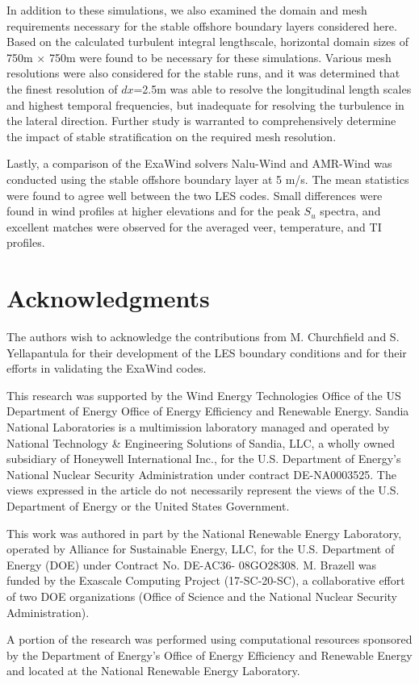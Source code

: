 \documentclass[conf]{new-aiaa}
\begin{document}
In addition to these simulations, we also examined the domain and mesh
requirements necessary for the stable offshore boundary layers
considered here.  Based on the calculated turbulent integral
lengthscale, horizontal domain sizes of 750m $\times$ 750m were found
to be necessary for these simulations.  Various mesh resolutions were
also considered for the stable runs, and it was determined that the
finest resolution of $dx$=2.5m was able to resolve the longitudinal
length scales and highest temporal frequencies, but inadequate for
resolving the turbulence in the lateral direction.  Further study is
warranted to comprehensively determine the impact of stable
stratification on the required mesh resolution.

Lastly, a comparison of the ExaWind solvers Nalu-Wind and AMR-Wind was
conducted using the stable offshore boundary layer at 5 m/s.  The mean
statistics were found to agree well between the two LES codes.  Small
differences were found in wind profiles at higher elevations and for
the peak $S_u$ spectra, and excellent matches were observed for the
averaged veer, temperature, and TI profiles.



\section*{Acknowledgments}

The authors wish to acknowledge the contributions from M. Churchfield
and S. Yellapantula for their development of the LES boundary
conditions and for their efforts in validating the ExaWind codes.

This research was supported by the Wind Energy Technologies Office of
the US Department of Energy Office of Energy Efficiency and Renewable
Energy.  Sandia National Laboratories is a multimission laboratory
managed and operated by National Technology \& Engineering Solutions
of Sandia, LLC, a wholly owned subsidiary of Honeywell International
Inc., for the U.S. Department of Energy's National Nuclear Security
Administration under contract DE-NA0003525. The views expressed in the
article do not necessarily represent the views of the U.S. Department
of Energy or the United States Government.

This work was authored in part by the National Renewable Energy
Laboratory, operated by Alliance for Sustainable Energy, LLC, for the
U.S. Department of Energy (DOE) under Contract No. DE-AC36-
08GO28308. M. Brazell was funded by the Exascale Computing
Project (17-SC-20-SC), a collaborative effort of two DOE organizations
(Office of Science and the National Nuclear Security Administration).

A portion of the research was performed using computational
resources sponsored by the Department of Energy's Office of Energy
Efficiency and Renewable Energy and located at the National Renewable
Energy Laboratory.


\end{document}
